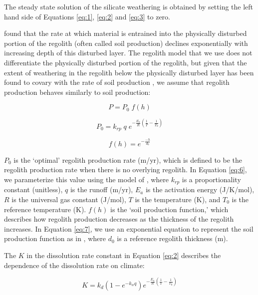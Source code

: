 \documentclass[11pt,letterpaper]{article}
\begin{document}
The steady state solution of the silicate weathering is obtained by setting the left hand side of Equations \ref{eq:1}, \ref{eq:2} and \ref{eq:3} to zero.

\citet{Heimsath1997a} found that the rate at which material is entrained into the physically disturbed portion of the regolith (often called soil production) declines exponentially with increasing depth of this disturbed layer. The regolith model that we use does not differentiate the physically disturbed portion of the regolith, but given that the extent of weathering in the regolith below the physically disturbed layer has been found to covary with the rate of soil production \citep{Burke2007a}, we assume that regolith production behaves similarly to soil production:

\begin{equation}
    P = P_{0}\;f(h)
    \label{eq:5}
\end{equation}

\begin{equation}
    P_{0} = k_{rp}\;q\;e^{-\frac{E_{a}}{R}\left(\frac{1}{T}-\frac{1}{T_{0}}\right)}
    \label{eq:6}
\end{equation}

\begin{equation}
    f(h) = e^{-\frac{-h}{d_{0}}}
    \label{eq:7}
\end{equation}

\noindent
$P_{0}$ is the `optimal' regolith production rate (m/yr), which is defined to be the regolith production rate when there is no overlying regolith. In Equation \ref{eq:6}, we parameterize this value using the model of \citet{Carretier2014a}, where $k_{rp}$ is a proportionality constant (unitless), $q$ is the runoff (m/yr), $E_{a}$ is the activation energy (J/K/mol), $R$ is the universal gas constant (J/mol), $T$ is the temperature (K), and $T_{0}$ is the reference temperature (K). $f(h)$ is the `soil production function,' which describes how regolith production decreases as the thickness of the regolith increases. In Equation \ref{eq:7}, we use an exponential equation to represent the soil production function as in \citet{Heimsath1997a}, where $d_{0}$ is a reference regolith thickness (m).

The $K$ in the dissolution rate constant in Equation \ref{eq:2} describes the dependence of the dissolution rate on climate:

\begin{equation}
    K = k_{d}\left(1-e^{-k_{w}q}\right)e^{-\frac{E_{a}}{R}\left(\frac{1}{T}-\frac{1}{T_{0}}\right)}
    \label{eq:8}
\end{equation}
\end{document}
